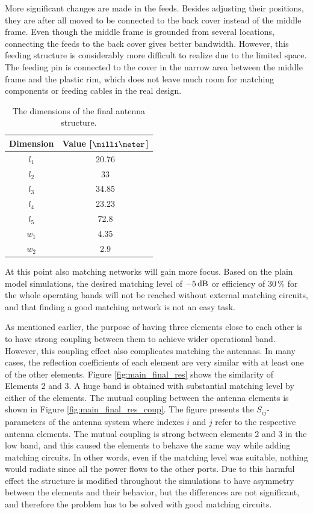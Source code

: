 More significant changes are made in the feeds. Besides adjusting their positions, they are after all moved to be connected to the back cover instead of the middle frame. Even though the middle frame is grounded from several locations, connecting the feeds to the back cover gives better bandwidth. However, this feeding structure is considerably more difficult to realize due to the limited space. The feeding pin is connected to the cover in the narrow area between the middle frame and the plastic rim, which does not leave much room for matching components or feeding cables in the real design.
\begin{table}[H]
    \centering
    \caption{The dimensions of the final antenna structure.}
    \label{tab:main_final}
    \begin{tabular}{|c|c|}
        \hline
        \textbf{Dimension} & \textbf{Value [$\milli\meter$]}\\
        \hline
        $l_1$ & 20.76 \\
        \hline
        $l_2$ & 33\\
        \hline
        $l_3$ & 34.85 \\
        \hline
        $l_4$ & 23.23 \\
        \hline
        $l_5$ & 72.8 \\
        \hline
        $w_1$ & 4.35\\
        \hline
        $w_2$ & 2.9\\
        \hline
    \end{tabular}
    \vspace{-10pt}
\end{table}
At this point also matching networks will gain more focus. Based on the plain model simulations, the desired matching level of $-5\,\mathrm{dB}$ or efficiency of $30\,\%$ for the whole operating bands will not be reached without external matching circuits, and that finding a good matching network is not an easy task.

As mentioned earlier, the purpose of having three elements close to each other is to have strong coupling between them to achieve wider operational band. However, this coupling effect also complicates matching the antennas. In many cases, the reflection coefficients of each element are very similar with at least one of the other elements. Figure \ref{fig:main_final_res} shows the similarity of Elements 2 and 3. A huge band is obtained with substantial matching level by either of the elements. The mutual coupling between the antenna elements is shown in Figure \ref{fig:main_final_res_coup}. The figure presents the $S_{ij}$-parameters of the antenna system where indexes $i$ and $j$ refer to the respective antenna elements. The mutual coupling is strong between elements 2 and 3 in the low band, and this caused the elements to behave the same way while adding matching circuits. In other words, even if the matching level was suitable, nothing would radiate since all the power flows to the other ports. Due to this harmful effect the structure is modified throughout the simulations to have asymmetry between the elements and their behavior, but the differences are not significant, and therefore the problem has to be solved with good matching circuits.

